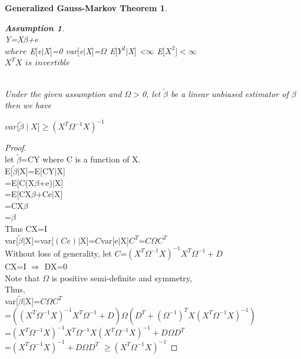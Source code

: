 \documentclass{article}
\newtheorem*{Theorem}{Generalized Gauss-Markov Theorem}
\newtheorem*{Assumption}{Assumption}
\begin{document}
\begin{Theorem}
  \begin{Assumption}
  	~\\
  	Y=X$\beta$+e\\
  	$where$ E$\lbrack$e$\mid$X$\rbrack$=0 \quad 
  	var$\lbrack$e$\mid$X$\rbrack$=$\Omega$\quad
  	E$\lbrack$$Y^2$$\mid$X$\rbrack$ \textless$\infty$\quad
  	E$\lbrack$$X^{2}$$\rbrack$$<$$\infty$\\
  	$X^{T}X$ $is$ $invertible$
  \end{Assumption}
  ~\\
  Under the given assumption and $\Omega$$>$0, let $\tilde{\beta}$ be a linear unbiased estimator of $\beta$ then we have\\ 
  \begin{center}$ var\lbrack\tilde{\beta}\mid X\rbrack\geq(X^{T}\Omega^{-1}X)^{-1}$\end{center}
\end{Theorem}
\linespread{1.5}
\begin{proof}
	~\\
	let $\tilde{\beta}$=CY where C is a function of X. \\
	E[$\tilde{\beta}$$\mid$X]=E[CY$\mid$X]\\
	=E[C(X$\beta$+e)$\mid$X]\\
	=E[CX$\beta$+Ce$\mid$X]\\
	=CX$\beta$\\
	=$\beta$\\
	Thus CX=I\\
	var[$\tilde{\beta}$$\mid$X]=var[$(Ce)$$\mid$X]=$C$var[e$\mid$X]$C^{T}$=$C$$\Omega$$C^{T}$\\
	Without loss of generality, let $C$=$(X^{T}\Omega^{-1}X)^{-1}X^{T}\Omega^{-1}+D$\\
	CX=I $\Rightarrow$ DX=0\\
	Note that $\Omega$ is positive semi-definite and symmetry,\\
	Thus,\\ var[$\tilde{\beta}$$\mid$X]=$C$$\Omega$$C^{T}$\\
	=$((X^{T}\Omega^{-1}X)^{-1}X^{T}\Omega^{-1}+D)\Omega(D^{T}+(\Omega^{-1})^{T}X(X^{T}\Omega^{-1}X)^{-1})$\\
	=$(X^{T}\Omega^{-1}X)^{-1}X^{T}\Omega^{-1}X(X^{T}\Omega^{-1}X)^{-1}+D \Omega D^{T}$\\
	=$(X^{T}\Omega^{-1}X)^{-1}+D \Omega D^{T}$
	$\geq$$(X^{T}\Omega^{-1}X)^{-1}$
\end{proof}
\end{document}

